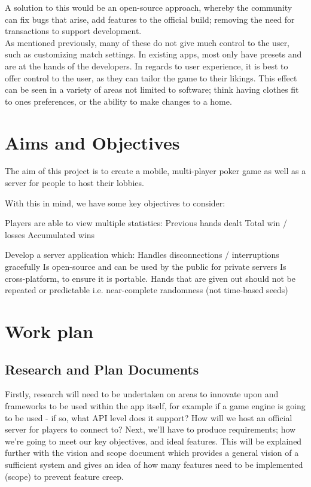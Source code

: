 \documentclass[11pt]{article}
\begin{document}
{\begin{center}
\end{center}


A solution to this would be an open-source approach, whereby the community can fix bugs that arise, add features to the official build; removing the need for transactions to support development. \\ 

As mentioned previously, many of these do not give much control to the user, such as customizing match settings. In existing apps, most only have presets and are at the hands of the developers. In regards to user experience, it is best to offer control to the user, as they can tailor the game to their likings. This effect can be seen in a variety of areas not limited to software; think having clothes fit to ones preferences, or the ability to make changes to a home. %

\newpage
\section*{Aims and Objectives}

The aim of this project is to create a mobile, multi-player poker game as well as a server for people to host their lobbies. 

With this in mind, we have some key objectives to consider: 

\begin{outline}
	\1 Players are able to view multiple statistics:
		\2 Previous hands dealt
		\2 Total win / losses
		\2 Accumulated wins	
	
	\1 Develop a server application which: 
		\2 Handles disconnections / interruptions gracefully
		\2 Is open-source and can be used by the public for private servers
		\2 Is cross-platform, to ensure it is portable.
	\1 Hands that are given out should not be repeated or predictable i.e. near-complete randomness (not time-based seeds)
\end{outline}

\newpage
\section*{Work plan}


\subsection*{Research and Plan Documents}

Firstly, research will need to be undertaken on areas to innovate upon and frameworks to be used within the app itself, for example if a game engine is going to be used - if so, what API level does it support? How will we host an official server for players to connect to? Next, we'll have to produce requirements; how we're going to meet our key objectives, and ideal features. This will be explained further with the vision and scope document which provides a general vision of a sufficient system and gives an idea of how many features need to be implemented (scope) to prevent feature creep.


}
\end{document}
